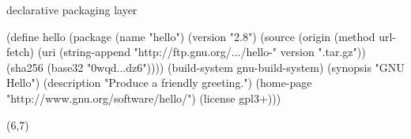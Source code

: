 \documentclass{beamer}
\begin{document}
\begin{frame}[fragile]{declarative packaging layer}
  \begin{semiverbatim}
    \small{
(define hello
  (\alert{package}
   (name "hello")
   (version "2.8")
   (source (\alert{origin}
            (method url-fetch)
            (uri (string-append
                  "http://ftp.gnu.org/\textrm{...}/hello-" version
                  ".tar.gz"))
            (sha256 (base32 "0wqd\textrm{...}dz6"))))
   (\alert{build-system} gnu-build-system)
   (synopsis "GNU Hello")
   (description "Produce a friendly greeting.")
   (home-page "http://www.gnu.org/software/hello/")
   (license gpl3+)))
}
  \end{semiverbatim}

  \begin{textblock}{15}(6,7)
  \end{textblock}
\end{frame}
\end{document}
